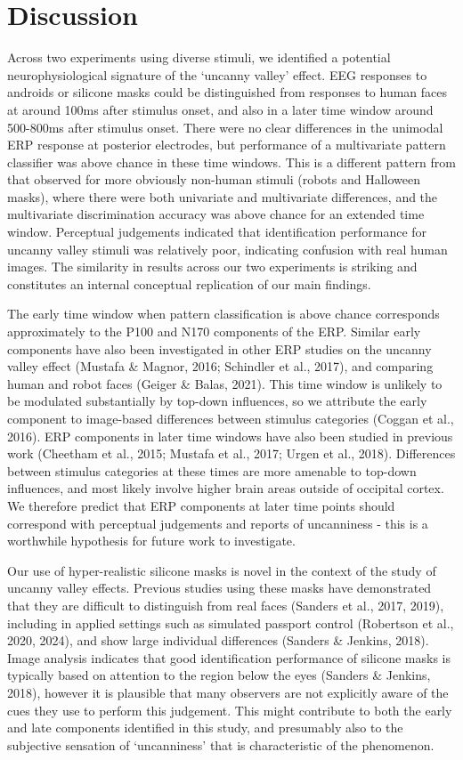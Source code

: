 \documentclass[
]{article}
\begin{document}
\section{Discussion}\label{discussion}

Across two experiments using diverse stimuli, we identified a potential neurophysiological signature of the `uncanny valley' effect. EEG responses to androids or silicone masks could be distinguished from responses to human faces at around 100ms after stimulus onset, and also in a later time window around 500-800ms after stimulus onset. There were no clear differences in the unimodal ERP response at posterior electrodes, but performance of a multivariate pattern classifier was above chance in these time windows. This is a different pattern from that observed for more obviously non-human stimuli (robots and Halloween masks), where there were both univariate and multivariate differences, and the multivariate discrimination accuracy was above chance for an extended time window. Perceptual judgements indicated that identification performance for uncanny valley stimuli was relatively poor, indicating confusion with real human images. The similarity in results across our two experiments is striking and constitutes an internal conceptual replication of our main findings.

The early time window when pattern classification is above chance corresponds approximately to the P100 and N170 components of the ERP. Similar early components have also been investigated in other ERP studies on the uncanny valley effect (Mustafa \& Magnor, 2016; Schindler et al., 2017), and comparing human and robot faces (Geiger \& Balas, 2021). This time window is unlikely to be modulated substantially by top-down influences, so we attribute the early component to image-based differences between stimulus categories (Coggan et al., 2016). ERP components in later time windows have also been studied in previous work (Cheetham et al., 2015; Mustafa et al., 2017; Urgen et al., 2018). Differences between stimulus categories at these times are more amenable to top-down influences, and most likely involve higher brain areas outside of occipital cortex. We therefore predict that ERP components at later time points should correspond with perceptual judgements and reports of uncanniness - this is a worthwhile hypothesis for future work to investigate.

Our use of hyper-realistic silicone masks is novel in the context of the study of uncanny valley effects. Previous studies using these masks have demonstrated that they are difficult to distinguish from real faces (Sanders et al., 2017, 2019), including in applied settings such as simulated passport control (Robertson et al., 2020, 2024), and show large individual differences (Sanders \& Jenkins, 2018). Image analysis indicates that good identification performance of silicone masks is typically based on attention to the region below the eyes (Sanders \& Jenkins, 2018), however it is plausible that many observers are not explicitly aware of the cues they use to perform this judgement. This might contribute to both the early and late components identified in this study, and presumably also to the subjective sensation of `uncanniness' that is characteristic of the phenomenon.
\end{document}
